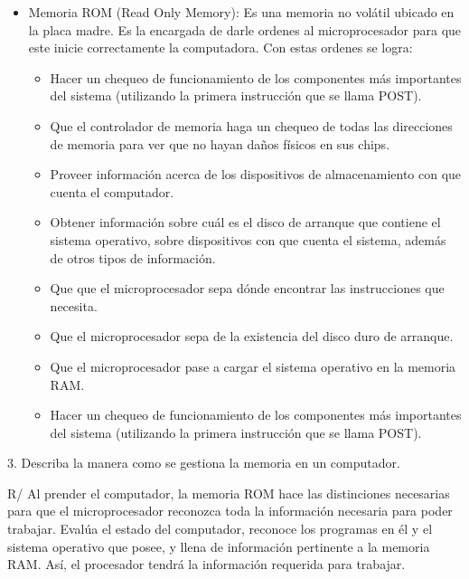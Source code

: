 \documentclass{article}
\begin{document}
\begin{itemize}
    \item Memoria ROM (Read Only Memory):
    Es una memoria no volátil ubicado en la placa madre.
    Es la encargada de darle ordenes al microprocesador para que este inicie correctamente la computadora.
    Con estas ordenes se logra: 
        \begin{itemize}
        \item
            Hacer un chequeo de funcionamiento de los componentes más importantes del sistema (utilizando la primera instrucción que se llama POST).
        \item 
            Que el controlador de memoria haga un chequeo de todas las direcciones de memoria para ver que no hayan daños físicos en sus chips. 
        \item 
            Proveer información acerca de los dispositivos de almacenamiento con que cuenta el computador.
        \item 
            Obtener información sobre cuál es el disco de arranque que contiene el sistema operativo, sobre dispositivos con que cuenta el sistema, además de otros tipos de información.
        \item
            Que que el microprocesador sepa dónde encontrar las instrucciones que necesita.
        \item
            Que el microprocesador sepa de la existencia del disco duro de arranque.
        \item
            Que el microprocesador pase a cargar el sistema operativo en la memoria RAM.
        \item
            Hacer un chequeo de funcionamiento de los componentes más importantes del sistema (utilizando la primera instrucción que se llama POST).
        \end{itemize}


\end{itemize}




\vspace{0.5cm}

\vspace{0.5cm}
3. Describa la manera como se gestiona la memoria en un computador.

R/ Al prender el computador, la memoria ROM hace las distinciones necesarias para que el microprocesador reconozca toda la información necesaria para poder trabajar. Evalúa el estado del computador, reconoce los programas en él y el sistema operativo que posee, y llena de información pertinente a la memoria RAM. Así, el procesador tendrá la información requerida para trabajar.
\end{document}
